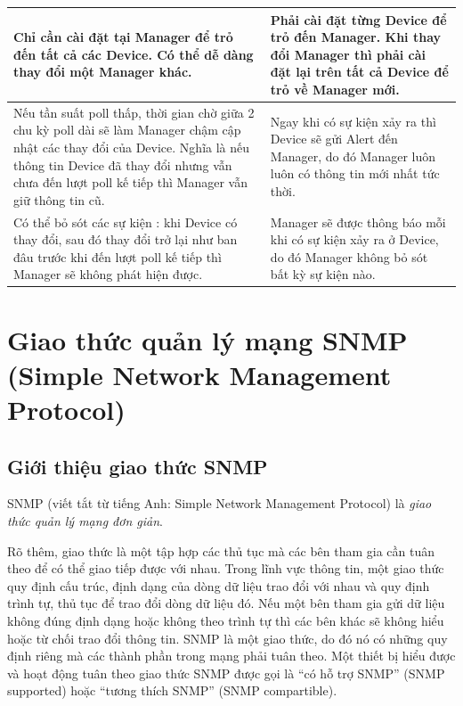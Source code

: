 \documentclass[12pt,oneside,a4paper,reqno]{report}
\begin{document}
\begin{large}
\begin{longtable}{|p{8cm}|p{8cm}|}
Chỉ cần cài đặt tại Manager để trỏ đến tất cả các Device. Có thể dễ dàng thay đổi một Manager khác.                                                                                                                                                            & Phải cài đặt từng Device để trỏ đến Manager. Khi thay đổi Manager thì phải cài đặt lại trên tất cả Device để trỏ về Manager mới.                                                                                                              \\ \hline
Nếu tần suất poll thấp, thời gian chờ giữa 2 chu kỳ poll dài sẽ làm Manager chậm cập nhật các thay đổi của Device. Nghĩa là nếu thông tin Device đã thay đổi nhưng vẫn chưa đến lượt poll kế tiếp thì Manager vẫn giữ thông tin cũ.                            & Ngay khi có sự kiện xảy ra thì Device sẽ gửi Alert đến Manager, do đó Manager luôn luôn có thông tin mới nhất tức thời.                                                                                                                       \\ \hline
Có thể bỏ sót các sự kiện : khi Device có thay đổi, sau đó thay đổi trở lại như ban đâu trước khi đến lượt poll kế tiếp thì Manager sẽ không phát hiện được.                                                                                                   & Manager sẽ được thông báo mỗi khi có sự kiện xảy ra ở Device, do đó Manager không bỏ sót bất kỳ sự kiện nào.                                                                                                                                  \\ \hline
\end{longtable}

\section{Giao thức quản lý mạng SNMP (Simple Network Management Protocol)}
\subsection{Giới thiệu giao thức SNMP}
SNMP (viết tắt từ tiếng Anh: Simple Network Management Protocol) là {\it giao thức quản lý mạng đơn giản}.

Rõ thêm, giao thức là một tập hợp các thủ tục mà các bên tham gia cần tuân theo để có thể giao tiếp được với nhau. Trong lĩnh vực thông tin, một giao thức quy định cấu trúc, định dạng của dòng dữ liệu trao đổi với nhau và quy định trình tự, thủ tục để trao đổi dòng dữ liệu đó. Nếu một bên tham gia gửi dữ liệu không đúng định dạng hoặc không theo trình tự thì các bên khác sẽ không hiểu hoặc từ chối trao đổi thông tin. SNMP là một giao thức, do đó nó có những quy định riêng mà các thành phần trong mạng phải tuân theo. Một thiết bị hiểu được và hoạt động tuân theo giao thức SNMP được gọi là “có hỗ trợ SNMP” (SNMP supported) hoặc “tương thích SNMP” (SNMP compartible).


\end{large}
\end{document}
